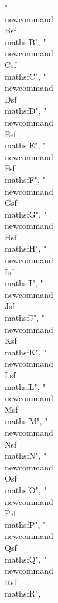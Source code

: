 {"\\newcommand{\\Bsf}{\\mathsf{B}}",
"\\newcommand{\\Csf}{\\mathsf{C}}",
"\\newcommand{\\Dsf}{\\mathsf{D}}",
"\\newcommand{\\Esf}{\\mathsf{E}}",
"\\newcommand{\\Fsf}{\\mathsf{F}}",
"\\newcommand{\\Gsf}{\\mathsf{G}}",
"\\newcommand{\\Hsf}{\\mathsf{H}}",
"\\newcommand{\\Isf}{\\mathsf{I}}",
"\\newcommand{\\Jsf}{\\mathsf{J}}",
"\\newcommand{\\Ksf}{\\mathsf{K}}",
"\\newcommand{\\Lsf}{\\mathsf{L}}",
"\\newcommand{\\Msf}{\\mathsf{M}}",
"\\newcommand{\\Nsf}{\\mathsf{N}}",
"\\newcommand{\\Osf}{\\mathsf{O}}",
"\\newcommand{\\Psf}{\\mathsf{P}}",
"\\newcommand{\\Qsf}{\\mathsf{Q}}",
"\\newcommand{\\Rsf}{\\mathsf{R}}",
}
